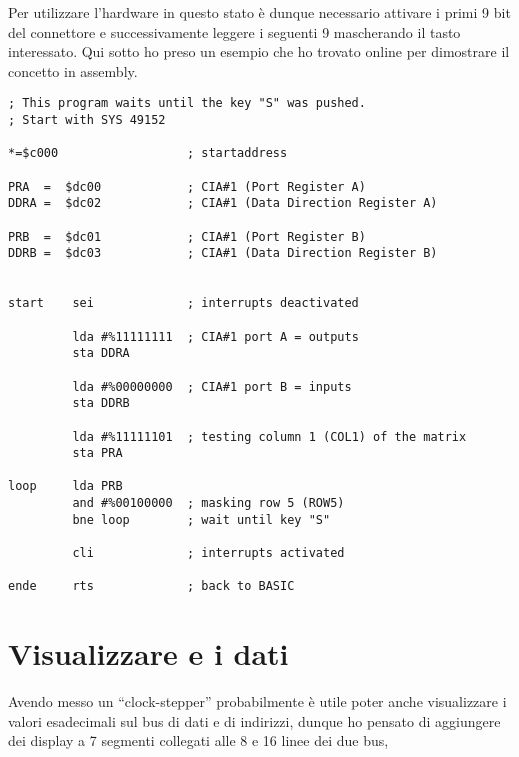 \documentclass[final, ms, a4paper, 11pt]{memoir}
\newcommand\ddate{01.01.1970}
\begin{document}
Per utilizzare l'hardware in questo stato \`e dunque necessario attivare i
primi 9 bit del connettore e successivamente leggere i seguenti 9 mascherando il
tasto interessato. Qui sotto ho preso un esempio che ho trovato online per
dimostrare il concetto in assembly.

\begin{centering}
\begin{verbatim}
; This program waits until the key "S" was pushed.
; Start with SYS 49152

*=$c000                  ; startaddress 

PRA  =  $dc00            ; CIA#1 (Port Register A)
DDRA =  $dc02            ; CIA#1 (Data Direction Register A)

PRB  =  $dc01            ; CIA#1 (Port Register B)
DDRB =  $dc03            ; CIA#1 (Data Direction Register B)


start    sei             ; interrupts deactivated

         lda #%11111111  ; CIA#1 port A = outputs 
         sta DDRA             

         lda #%00000000  ; CIA#1 port B = inputs
         sta DDRB             

         lda #%11111101  ; testing column 1 (COL1) of the matrix
         sta PRA
            
loop     lda PRB
         and #%00100000  ; masking row 5 (ROW5) 
         bne loop        ; wait until key "S" 

         cli             ; interrupts activated

ende     rts             ; back to BASIC
\end{verbatim}
\end{centering}

\renewcommand\ddate{16.03.2017}
\section{Visualizzare e i dati}
Avendo messo un ``clock-stepper'' probabilmente \`e utile poter anche
visualizzare i valori esadecimali sul bus di dati e di indirizzi, dunque ho
pensato di aggiungere dei display a 7 segmenti collegati alle 8 e 16 linee dei
due bus, 
\end{document}
